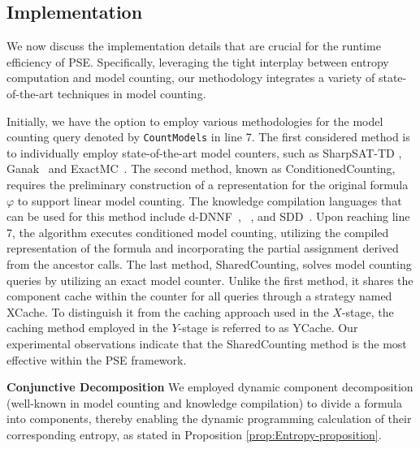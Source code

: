 \subsection{Implementation}

We now discuss the implementation details that are crucial for the runtime efficiency of PSE. 
Specifically, leveraging the tight interplay between entropy computation and model counting, our methodology integrates a variety of state-of-the-art techniques in model counting.

Initially, we have the option to employ various methodologies for the model counting query denoted by \texttt{CountModels} in line 7.
The first considered method is to individually employ state-of-the-art model counters, such as SharpSAT-TD \cite{korhonen2021integrating}, Ganak~\cite{sharma2019ganak} and ExactMC~\cite{lai2021power}. %
The second method, known as \textsf{ConditionedCounting}, requires the preliminary construction of a representation for the original formula $\varphi$ to support linear model counting. 
The knowledge compilation languages that can be used for this method include d-DNNF~\cite{darwiche2004new}, \OBDDAND~\cite{lai2017new}, and SDD~\cite{choi2013compiling}.
Upon reaching line 7, the algorithm executes conditioned model counting, utilizing the compiled representation of the formula and incorporating the partial assignment derived from the ancestor calls.
The last method, \textsf{SharedCounting}, solves model counting queries by utilizing an exact model counter. Unlike the first method, it shares the component cache within the counter for all queries through a strategy named \textsf{XCache}. 
To distinguish it from the caching approach used in the $X$-stage, the caching method employed in the $Y$-stage is referred to as \textsf{YCache}.
Our experimental observations indicate that the \textsf{SharedCounting} method is the most effective within the PSE framework.



\textbf{Conjunctive Decomposition}
We employed dynamic component decomposition (well-known in model counting and knowledge compilation) to divide a formula into components, thereby enabling the dynamic programming calculation of their corresponding entropy, as stated in Proposition \ref{prop:Entropy-proposition}.


